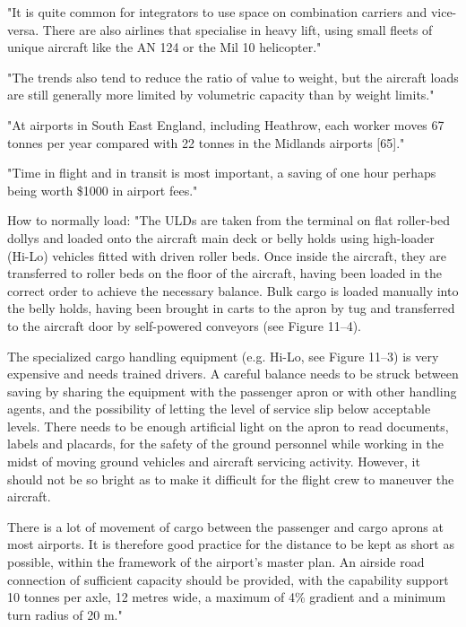 "It is quite common for integrators to use space on combination carriers and vice-versa. There are also airlines that specialise in heavy lift, using small fleets of unique aircraft like the AN 124 or the Mil 10 helicopter."


"The trends also tend to reduce the ratio of value to weight, but the aircraft loads are still generally more limited by volumetric capacity than by weight limits."


"At airports in South East England, including Heathrow, each worker moves 67 tonnes per year compared with 22 tonnes in the Midlands airports [65]."


"Time in flight and in transit is most important, a saving of one hour perhaps being worth \$1000 in airport fees."


How to normally load:
"The ULDs are taken from the terminal on flat roller-bed dollys and loaded onto the aircraft main deck or belly holds using high-loader (Hi-Lo) vehicles fitted with driven roller beds.
Once inside the aircraft, they are transferred to roller beds on the floor of the aircraft, having been loaded in the correct order to achieve the necessary balance. Bulk cargo is loaded manually into the belly holds, having been brought in carts to the apron by tug and transferred to the aircraft door by self-powered conveyors (see Figure 11–4).

The specialized cargo handling equipment (e.g. Hi-Lo, see Figure 11–3) is very expensive and needs trained drivers. A careful balance needs to be struck between saving by sharing the equipment with the passenger apron or with other handling agents, and the possibility of letting the level of service slip below acceptable levels.
There needs to be enough artificial light on the apron to read documents, labels and placards, for the safety of the ground personnel while working in the midst of moving ground vehicles and aircraft servicing activity. However, it should not be so bright as to make it difficult for the flight crew to maneuver the aircraft.

There is a lot of movement of cargo between the passenger and cargo aprons at most airports.
It is therefore good practice for the distance to be kept as short as possible, within the framework of the airport’s master plan. An airside road connection of sufficient capacity should be provided, with the capability support 10 tonnes per axle, 12 metres wide, a maximum of 4\% gradient and a minimum turn radius of 20 m."

